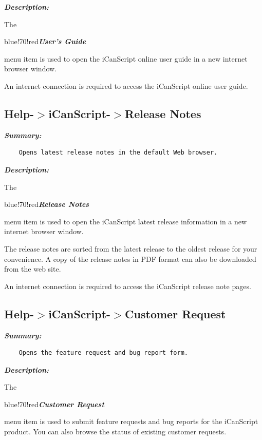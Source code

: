 \emph{\textbf{Description:}}

The \begin{color}{blue!70!red}\emph{\textbf{User's Guide}}\end{color} menu item is used to open the iCanScript online user guide in a new internet browser window.

An internet connection is required to access the iCanScript online user guide.

\subsection{Help-$>$iCanScript-$>$Release Notes}
\label{help-icanscript-releasenotes}

\emph{\textbf{Summary:}}

\begin{verbatim}
    Opens latest release notes in the default Web browser.
\end{verbatim}

\emph{\textbf{Description:}}

The \begin{color}{blue!70!red}\emph{\textbf{Release Notes}}\end{color} menu item is used to open the iCanScript latest release information in a new internet browser window.

The release notes are sorted from the latest release to the oldest release for your convenience. A copy of the release notes in PDF format can also be downloaded from the web site.

An internet connection is required to access the iCanScript release note pages.

\subsection{Help-$>$iCanScript-$>$Customer Request}
\label{help-icanscript-customerrequest}

\emph{\textbf{Summary:}}

\begin{verbatim}
    Opens the feature request and bug report form.
\end{verbatim}

\emph{\textbf{Description:}}

The \begin{color}{blue!70!red}\emph{\textbf{Customer Request}}\end{color} menu item is used to submit feature requests and bug reports for the iCanScript product. You can also browse the status of existing customer requests.

